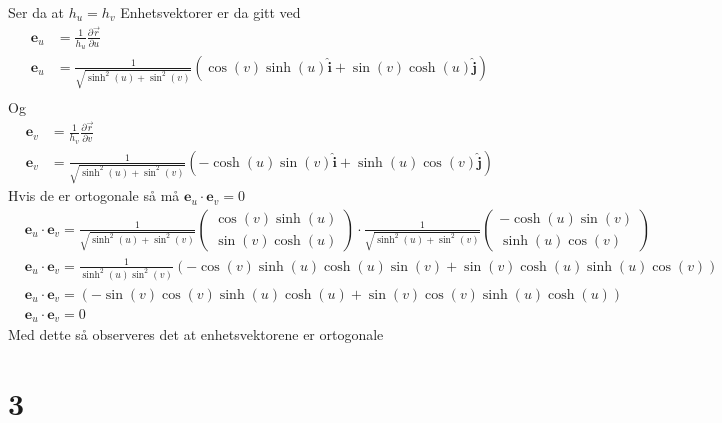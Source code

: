 \documentclass[a4paper,10pt,norsk]{article}
\newcommand{\uvec}[1]{\boldsymbol{\hat{\textbf{#1}}}}
\begin{document}
	Ser da at $h_u = h_v$
	Enhetsvektorer er da gitt ved 
	\begin{align*}
		\mathbf{e}_u &= \frac{1}{h_u} \frac{\partial \vec{r} }{\partial u} \\
		\mathbf{e}_u &= \frac{1}{\sqrt{\sinh^2 \left( u \right) + \sin^2 \left( v \right) }} \left( \cos(v) \sinh \left( u \right) \uvec{i} + \sin(v) \cosh \left( u \right) \uvec{j} \right) \\
	\end{align*}
	Og
	\begin{align*}
		\mathbf{e}_v &= \frac{1}{h_v} \frac{\partial \vec{r} }{\partial v} \\
		\mathbf{e}_v &= \frac{1}{\sqrt{\sinh^2 \left( u \right) + \sin^2 \left( v \right) }} \left( -\cosh \left( u \right) \sin(v) \uvec{i} + \sinh \left( u \right)  \cos(v) \uvec{j} \right) 
	\end{align*}
	Hvis de er ortogonale så må $\mathbf{e}_u \cdot \mathbf{e}_v = 0$
	\begin{align*}
		&\mathbf{e}_u \cdot \mathbf{e}_v = 
			\frac{1}{\sqrt{\sinh^2 \left( u \right) + \sin^2 \left( v \right) }}
			\begin{pmatrix}
			\cos(v) \sinh \left( u \right) \\ \sin(v) \cosh \left( u \right)
			\end{pmatrix}
			\cdot \frac{1}{\sqrt{\sinh^2 \left( u \right) + \sin^2 \left( v \right) }}
			\begin{pmatrix}
			-\cosh \left( u \right) \sin(v) \\
			\sinh \left( u \right) \cos(v)
			\end{pmatrix}\\
		&\mathbf{e}_u \cdot \mathbf{e}_v = \frac{1}{\sinh^2 \left( u \right) \sin^2 \left( v \right) } \left(- \cos(v) \sinh \left( u \right) \cosh \left( u \right) \sin(v)
		+ \sin(v) \cosh \left( u \right) \sinh \left( u \right) \cos(v) \right) \\
		&\mathbf{e}_u \cdot \mathbf{e}_v = \left( - \sin(v) \cos(v) \sinh \left( u \right) \cosh \left( u \right) + \sin(v) \cos(v) \sinh \left( u \right) \cosh \left( u \right)  \right) \\
		&\mathbf{e}_u \cdot \mathbf{e}_v = 0
	\end{align*}
	Med dette så observeres det at enhetsvektorene er ortogonale

\section*{3}
\end{document}
